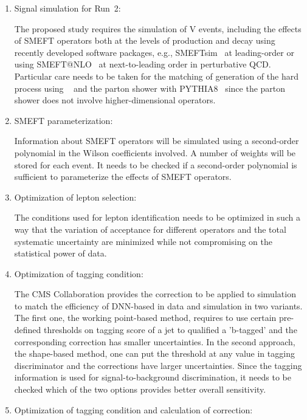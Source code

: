 \documentclass[a4paper,11pt]{article}
\newcommand{\Pb}{{{\Pqb}}\xspace}
\renewcommand{\PV}{{{{V}}}\xspace}
\newcommand{\VH}{{{\PV}{\PH}}\xspace}
\begin{document}
\begin{enumerate}

\item Signal simulation for Run~2:

The proposed study requires the simulation of \VH events, including the effects of SMEFT operators both at the levels of production and decay using recently developed software packages, e.g., SMEFTsim~\cite{Brivio:2020onw} at leading-order or using SMEFT@NLO~\cite{Degrande:2020evl} at next-to-leading order in perturbative QCD. 
Particular care needs to be taken for the matching of generation of the hard process using {\MGvATNLO}~\cite{Alwall:2014hca} and the parton shower with PYTHIA8~\cite{Sjostrand:2014zea} 
since the parton shower does not involve higher-dimensional operators. 

\item SMEFT parameterization:

Information about SMEFT operators will be simulated using a second-order polynomial in the Wilson coefficients involved. A number of weights will be stored for each event. 
It needs to be checked if a second-order polynomial is sufficient to parameterize the effects of SMEFT operators.

\item Optimization of lepton selection:

The conditions used for lepton identification needs to be optimized in such a way that the variation of acceptance for different operators and the total systematic uncertainty are minimized while not compromising on the statistical power of data. 

\item Optimization of \Pb tagging condition: 

The CMS Collaboration provides the correction to be applied to simulation to match the efficiency of DNN-based \Pb in data and simulation in two variants. 
The first one, the working point-based method, requires to use certain pre-defined thresholds on \Pb tagging score of a jet to qualified a 'b-tagged' and the corresponding correction has smaller uncertainties. 
In the second approach, the shape-based method, one can put the threshold at any value in \Pb tagging discriminator and the corrections have larger uncertainties. Since the \Pb tagging information is used for signal-to-background discrimination, it needs to be checked which of the two options provides better overall sensitivity.  

\item Optimization of \PH tagging condition and calculation of correction:


\end{enumerate}
\end{document}

